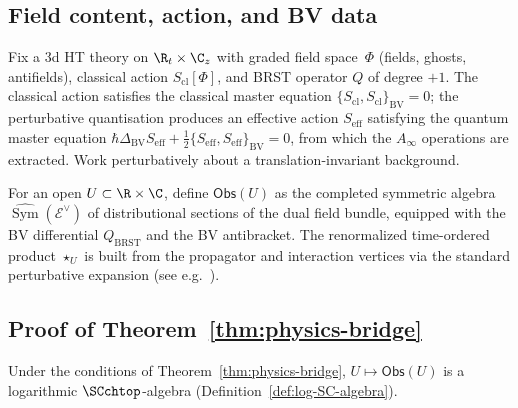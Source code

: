 \subsection{Field content, action, and BV data}
\label{subsec:BV-data}
Fix a 3d HT theory on $\R_t\times \C_z$ with graded field space~$\Phi$ (fields, ghosts, antifields), classical action $S_{\mathrm{cl}}[\Phi]$, and BRST operator $Q$ of degree $+1$. The classical action satisfies the classical master equation $\{S_{\mathrm{cl}},S_{\mathrm{cl}}\}_{\mathrm{BV}}=0$; the perturbative quantisation produces an effective action $S_{\mathrm{eff}}$ satisfying the quantum master equation $\hbar\Delta_{\mathrm{BV}} S_{\mathrm{eff}} + \tfrac{1}{2}\{S_{\mathrm{eff}}, S_{\mathrm{eff}}\}_{\mathrm{BV}} = 0$, from which the $A_\infty$ operations are extracted. Work perturbatively about a translation-invariant background.

\begin{definition}
\label{def:local-obs}
For an open $U\subset \R\times\C$, define $\mathsf{Obs}(U)$ as the completed symmetric algebra $\widehat{\operatorname{Sym}}(\mathcal{E}^\vee)$ of distributional sections of the dual field bundle, equipped with the BV differential $Q_{\mathrm{BRST}}$ and the BV antibracket. The renormalized time-ordered product $\star_U$ is built from the propagator and interaction vertices via the standard perturbative expansion (see e.g.\ \cite{CG17}).
\end{definition}

\subsection{Proof of Theorem~\ref{thm:physics-bridge}}
\label{subsec:analytic}

\begin{proposition}
\label{prop:prefact-Obs}
Under the conditions of Theorem~\ref{thm:physics-bridge}, $U\mapsto \mathsf{Obs}(U)$ is a logarithmic $\SCchtop$-algebra (Definition~\ref{def:log-SC-algebra}).
\end{proposition}

